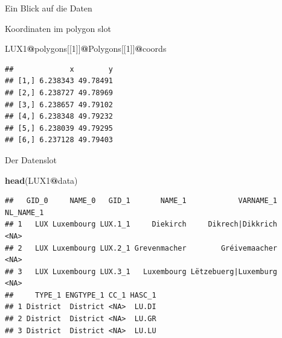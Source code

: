 \documentclass[ignorenonframetext,]{beamer}
\newenvironment{Shaded}{\begin{snugshade}}{\end{snugshade}}
\newcommand{\DecValTok}[1]{\textcolor[rgb]{0.00,0.00,0.81}{#1}}
\newcommand{\KeywordTok}[1]{\textcolor[rgb]{0.13,0.29,0.53}{\textbf{#1}}}
\newcommand{\NormalTok}[1]{#1}
\newcommand{\OperatorTok}[1]{\textcolor[rgb]{0.81,0.36,0.00}{\textbf{#1}}}
\begin{document}
\begin{frame}[fragile]{Ein Blick auf die Daten}
\protect\hypertarget{ein-blick-auf-die-daten}{}

Koordinaten im polygon slot

\begin{Shaded}
\begin{Highlighting}[]
\NormalTok{LUX1}\OperatorTok{@}\NormalTok{polygons[[}\DecValTok{1}\NormalTok{]]}\OperatorTok{@}\NormalTok{Polygons[[}\DecValTok{1}\NormalTok{]]}\OperatorTok{@}\NormalTok{coords}
\end{Highlighting}
\end{Shaded}

\begin{verbatim}
##             x        y
## [1,] 6.238343 49.78491
## [2,] 6.238727 49.78969
## [3,] 6.238657 49.79102
## [4,] 6.238348 49.79232
## [5,] 6.238039 49.79295
## [6,] 6.237128 49.79403
\end{verbatim}

\end{frame}

\begin{frame}[fragile]{Der Datenslot}
\protect\hypertarget{der-datenslot-1}{}

\begin{Shaded}
\begin{Highlighting}[]
\KeywordTok{head}\NormalTok{(LUX1}\OperatorTok{@}\NormalTok{data)}
\end{Highlighting}
\end{Shaded}

\begin{verbatim}
##   GID_0     NAME_0   GID_1       NAME_1            VARNAME_1 NL_NAME_1
## 1   LUX Luxembourg LUX.1_1     Diekirch     Dikrech|Dikkrich      <NA>
## 2   LUX Luxembourg LUX.2_1 Grevenmacher        Gréivemaacher      <NA>
## 3   LUX Luxembourg LUX.3_1   Luxembourg Lëtzebuerg|Luxemburg      <NA>
##     TYPE_1 ENGTYPE_1 CC_1 HASC_1
## 1 District  District <NA>  LU.DI
## 2 District  District <NA>  LU.GR
## 3 District  District <NA>  LU.LU
\end{verbatim}

\end{frame}
\end{document}
